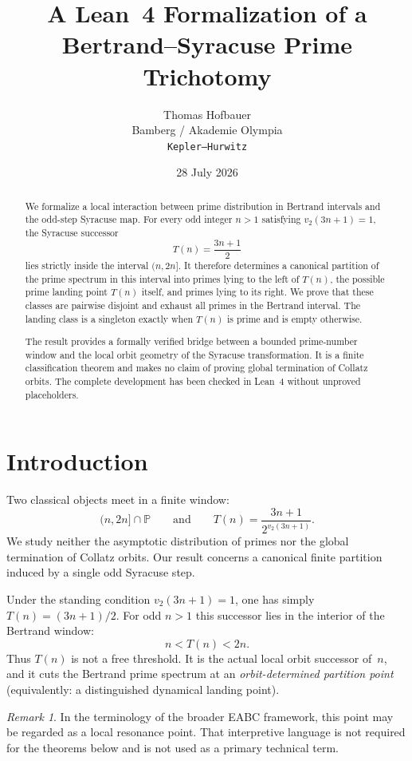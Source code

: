 \documentclass[11pt,a4paper]{article}
\title{A Lean~4 Formalization of a Bertrand--Syracuse Prime Trichotomy}
\author{Thomas Hofbauer\\
\small Bamberg / Akademie Olympia\\
\small\texttt{Kepler--Hurwitz}}
\date{28 July 2026}
\theoremstyle{definition}
\theoremstyle{remark}
\newtheorem{remark}[theorem]{Remark}
\newcommand{\TT}{T}
\begin{document}
\maketitle

\begin{abstract}
We formalize a local interaction between prime distribution in Bertrand
intervals and the odd-step Syracuse map. For every odd integer $n>1$
satisfying $v_2(3n+1)=1$, the Syracuse successor
\[
\TT(n)=\frac{3n+1}{2}
\]
lies strictly inside the interval $(n,2n]$. It therefore determines a
canonical partition of the prime spectrum in this interval into primes
lying to the left of $\TT(n)$, the possible prime landing point $\TT(n)$
itself, and primes lying to its right. We prove that these classes are
pairwise disjoint and exhaust all primes in the Bertrand interval. The
landing class is a singleton exactly when $\TT(n)$ is prime and is empty
otherwise.

The result provides a formally verified bridge between a bounded
prime-number window and the local orbit geometry of the Syracuse
transformation. It is a finite classification theorem and makes no claim
of proving global termination of Collatz orbits. The complete development
has been checked in Lean~4 without unproved placeholders.
\end{abstract}

\section{Introduction}

Two classical objects meet in a finite window:
\[
(n,2n]\cap\mathbb{P}
\qquad\text{and}\qquad
\TT(n)=\frac{3n+1}{2^{v_2(3n+1)}}.
\]
We study neither the asymptotic distribution of primes nor the global
termination of Collatz orbits. Our result concerns a canonical finite
partition induced by a single odd Syracuse step.

Under the standing condition $v_2(3n+1)=1$, one has simply
$\TT(n)=(3n+1)/2$. For odd $n>1$ this successor lies in the interior of
the Bertrand window:
\[
n<\TT(n)<2n.
\]
Thus $\TT(n)$ is not a free threshold. It is the actual local orbit
successor of~$n$, and it cuts the Bertrand prime spectrum at an
\emph{orbit-determined partition point}
(equivalently: a distinguished dynamical landing point).
\begin{remark}
In the terminology of the broader EABC framework, this point may be
regarded as a local resonance point. That interpretive language is not
required for the theorems below and is not used as a primary technical
term.
\end{remark}
\end{document}
